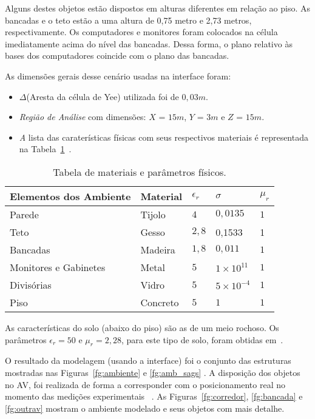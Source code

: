 	Alguns destes objetos estão dispostos em alturas diferentes em relação ao piso. As bancadas e o teto estão a uma altura de 0,75 metro e 2,73 metros, respectivamente. Os computadores e monitores foram colocados na célula imediatamente acima do nível das bancadas. Dessa forma, o plano relativo às bases dos computadores coincide com o plano das bancadas.

	As dimensões gerais desse cenário usadas na interface foram:
\begin{itemize}
\item \textit{$\Delta$}(Aresta da célula de Yee) utilizada foi de $0,03m$.
\item \textit{Região de Análise} com dimensões: $X$ = $15m$, $Y$ = $3m$ e $Z$ = $15m$.
\item \textit A lista das caraterísticas físicas com seus respectivos materiais é representada na Tabela~\ref{tab:materiais}~\cite{fabricio}.
\end{itemize}

\begin{table}
	\centering
	\caption{Tabela de materiais e parâmetros físicos.}
	\begin{tabular}{|l|l|l|l|l|}
	\hline
	Elementos dos Ambiente & Material & $\epsilon_r$ & $\sigma$ & $\mu_r$ \\ \hline
	Parede & Tijolo & $4$ & $0,0135$ & $1$\\ \hline
	Teto & Gesso & $2,8$ & 0,1533 & 1 \\ \hline
	Bancadas & Madeira & $1,8$ & $0,011$ & $1$\\ \hline
	Monitores e Gabinetes & Metal & $5$ & $1\times10^{11}$ & $1$\\ \hline
	Divisórias & Vidro & $5$ & $5\times10^{-4}$ & $1$ \\ \hline
	Piso & Concreto & $5$ & $1$ & $1$ \\
	\hline
	\end{tabular}	
	\label{tab:materiais}
\end{table}

	As características do solo (abaixo do piso) são as de um meio rochoso. Os parâmetros $\epsilon_r=50$ e $\mu_r=2{,}28$, para este tipo de solo, foram obtidas em~\cite{tanabe}.

	O resultado da modelagem (usando a interface) foi o conjunto das estruturas mostradas nas Figuras~\ref{fg:ambiente} e \ref{fg:amb_sags} . A disposição dos objetos no AV, foi realizada de forma a corresponder com o posicionamento real no momento das medições experimentais ~\cite{fabricio}. As Figuras~\ref{fg:corredor}, \ref{fg:bancada} e \ref{fg:outrav} mostram o ambiente modelado e seus objetos com mais detalhe.

